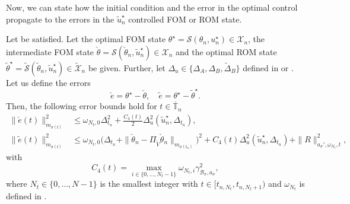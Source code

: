 \documentclass[reqno]{amsart}
\newcommand*\closure[1]{\overline{#1}}
\newcommand{\X}{{\mathscr X}}
\newcommand{\timeInt}{\mathbb{T}}
\newcommand{\state}{\theta}
\newcommand{\inpVar}{u}
\newcommand{\bOper}{\calB}
\newcommand{\solper}{\calS}
\newcommand{\initBound}{\initBoundn{n}}%
\newcommand{\initBoundn}[1]{\Delta_{t_{#1}}}
\newcommand{\intermediateInitState}{\intermediateState_n}%
\newcommand{\optState}{\state^\star}
\newcommand{\optInpVar}[1]{\inpVar_{#1}^\star}
\newcommand{\optInpVarN}{\optInpVar{n}}
\newcommand{\switch}{\sigma}
\newcommand{\nrSwitches}{N}
\newcommand{\reduce}[1]{\tilde{#1}}
\newcommand{\Vred}{\reduce{V}}
\newcommand{\projVred}{\Pi_{\Vred}}
\newcommand{\Xred}{\reduce{\X}}
\newcommand{\BoundControlA}{\Delta_{A}}
\newcommand{\BoundControlB}{\Delta_{B}}
\newcommand{\BoundControlBtil}{\tilde\Delta_{B}}
\newcommand{\err}{e}
\newcommand{\intermediateErr}{\check \err}
\newcommand{\redErr}{\reduce \err}
\newcommand{\residual}{R}
\newcommand{\stateRed}{\reduce{\state}}
\newcommand{\optStateRed}{\stateRed^\star}
\newcommand{\optInpVarRed}[1]{\reduce{\inpVar}_{#1}^\star}
\newcommand{\optInpVarRedN}{\optInpVarRed{n}}
\newcommand{\intermediateState}{\check{\state}}
\newcommand{\calB}{\mathcal{B}}
\newcommand{\calS}{\mathcal{S}}
\newcommand{\abbr}[1]{\textsf{#1}\xspace}
\newcommand{\FOM}{\abbr{FOM}}
\newcommand{\ROM}{\abbr{ROM}}
\begin{document}
%
Now, we can state how the initial condition and the error in the optimal control propagate to the errors in the $\optInpVarRedN$ controlled \FOM or \ROM state.
%
\begin{lemma}\label{lem:apost_optimal_state}
% 
Let  be satisfied. Let the optimal \FOM state $\optState=\solper(\state_n,\optInpVarN)\in \X_n$,
 the intermediate \FOM state $\intermediateState =\solper(\intermediateInitState,\optInpVarRedN)\in\X_n$ and
the optimal \ROM state $\optStateRed=\reduce\solper(\stateRed_n,\optInpVarRedN)\in \Xred_n$ be given.
Further, let $\Delta_u\in \{\BoundControlA,\BoundControlB,  \BoundControlBtil\}$ defined in  or . Let us define the errors
%
\begin{equation*}
    \intermediateErr=\optState-\intermediateState,\quad\redErr =\optState-\optStateRed.
\end{equation*}
%
Then, the following error bounds hold for $t\in \closure\timeInt_n$ 
\begin{align}
    \label{eqn:optStateBound:Venergy:FOMROM}
    \|\intermediateErr(t)\|_{m_{\switch(t)}}^2 
      &\leq  \omega_{\nrSwitches_t,0} \Delta_{t_n}^2
     +\frac{C_4(t)}{ 2}\Delta^2_u(\optInpVarRedN, \initBound),\\
    \|\redErr(t)\|_{m_{\switch(t)}}^2 
    &\leq \omega_{\nrSwitches_t,0} \big(\Delta_{t_n}+\|\intermediateInitState-\projVred\intermediateInitState\|_{m_{\switch{(t_n)}}} \big)^2 +C_4(t)\Delta^2_u(\optInpVarRedN, \initBound) + \|\residual\|_{a_{\switch}',\omega_{\nrSwitches_t}, t}^2,\label{eqn:optStateBound:Venergy:ROMROM}
\end{align}
%   
with 
%
\begin{equation}
    \nonumber
    C_4(t) = \max_{i\in\{0,\ldots,N_t-1\}}{\omega_{\nrSwitches_t,i}\gamma^2_{\bOper_{\switch},{a}_{\switch}}}{ },
\end{equation}
%
where $N_t\in\{0,\ldots,N-1\}$ is the smallest integer with $t\in [t_{n,N_t},t_{n,{N_{t}+1}})$ and $\omega_{N_t}$ is defined in . 
\end{lemma}
\end{document}
